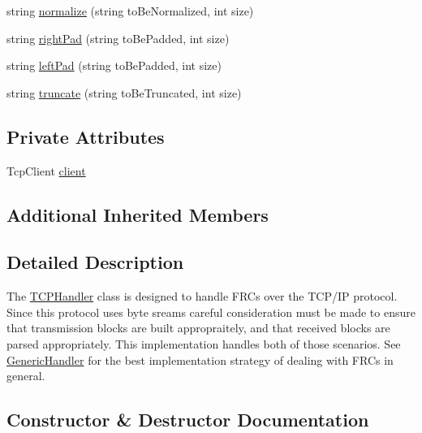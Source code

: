 \begin{DoxyCompactItemize}
\item 
string \mbox{\hyperlink{class_form_sim_1_1_t_c_p_handler_aa16ee3c9f634b4e00b7b2a7ec409fc89}{normalize}} (string to\+Be\+Normalized, int size)
\item 
string \mbox{\hyperlink{class_form_sim_1_1_t_c_p_handler_af33b52643998f6cdee82af449b8722ab}{right\+Pad}} (string to\+Be\+Padded, int size)
\item 
string \mbox{\hyperlink{class_form_sim_1_1_t_c_p_handler_afbcdb8bce1f946ff4549ed57786e85f7}{left\+Pad}} (string to\+Be\+Padded, int size)
\item 
string \mbox{\hyperlink{class_form_sim_1_1_t_c_p_handler_aa93d25e590a9ece741e94707b1f5d483}{truncate}} (string to\+Be\+Truncated, int size)
\end{DoxyCompactItemize}
\subsection*{Private Attributes}
\begin{DoxyCompactItemize}
\item 
Tcp\+Client \mbox{\hyperlink{class_form_sim_1_1_t_c_p_handler_ac98da866f5ae6c0eb8d772d7869f3158}{client}}
\end{DoxyCompactItemize}
\subsection*{Additional Inherited Members}


\subsection{Detailed Description}
The \mbox{\hyperlink{class_form_sim_1_1_t_c_p_handler}{T\+C\+P\+Handler}} class is designed to handle F\+R\+Cs over the T\+C\+P/\+IP protocol. Since this protocol uses byte sreams careful consideration must be made to ensure that transmission blocks are built appropraitely, and that received blocks are parsed appropriately. This implementation handles both of those scenarios. See \mbox{\hyperlink{class_form_sim_1_1_generic_handler}{Generic\+Handler}} for the best implementation strategy of dealing with F\+R\+Cs in general. 



\subsection{Constructor \& Destructor Documentation}
\mbox{\label{class_form_sim_1_1_t_c_p_handler_a26bcae2698f4403e85fbf24f3020eefb}} 
